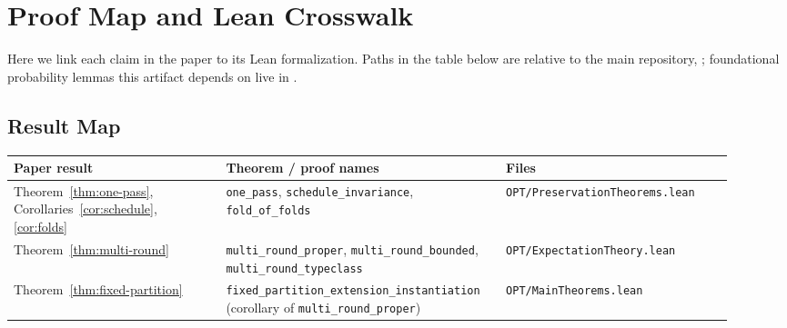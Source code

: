 \section{Proof Map and Lean Crosswalk}\label{app:proof-artifacts}

Here we link each claim in the paper to its Lean formalization. Paths
in the table below are relative to the main repository, \leanrepo;
foundational probability lemmas this artifact depends on live in
\probrepo.

\subsection{Result Map}

\begin{table}[h]
\centering
\small
\begin{tabular}{p{0.28\linewidth}p{0.34\linewidth}p{0.30\linewidth}}
\toprule
Paper result & Theorem / proof names & Files \\
\midrule
Theorem~\ref{thm:one-pass}, Corollaries~\ref{cor:schedule}, \ref{cor:folds} &
\texttt{one\_pass}, \texttt{schedule\_invariance}, \texttt{fold\_of\_folds} &
\texttt{OPT/PreservationTheorems.lean} \\

Theorem~\ref{thm:multi-round} &
\texttt{multi\_round\_proper}, \texttt{multi\_round\_bounded}, \texttt{multi\_round\_typeclass} &
\texttt{OPT/ExpectationTheory.lean} \\

Theorem~\ref{thm:fixed-partition} &
\texttt{fixed\_partition\_extension\_instantiation} (corollary of \texttt{multi\_round\_proper}) &
\texttt{OPT/MainTheorems.lean} \\


\end{tabular}
\end{table}
